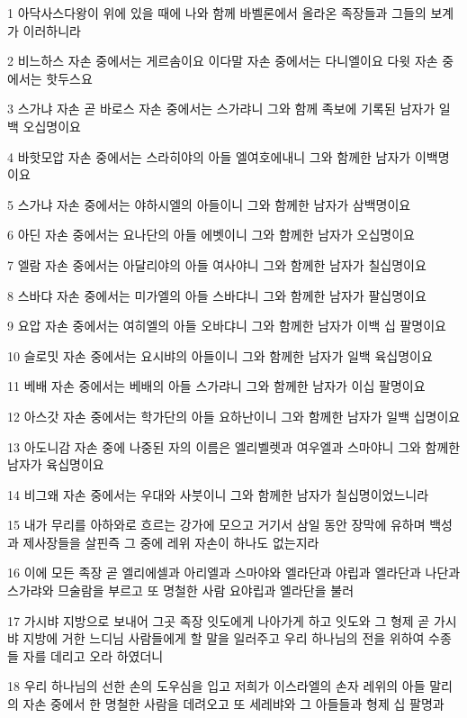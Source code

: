 \par 1 아닥사스다왕이 위에 있을 때에 나와 함께 바벨론에서 올라온 족장들과 그들의 보계가 이러하니라
\par 2 비느하스 자손 중에서는 게르솜이요 이다말 자손 중에서는 다니엘이요 다윗 자손 중에서는 핫두스요
\par 3 스가냐 자손 곧 바로스 자손 중에서는 스가랴니 그와 함께 족보에 기록된 남자가 일백 오십명이요
\par 4 바핫모압 자손 중에서는 스라히야의 아들 엘여호에내니 그와 함께한 남자가 이백명이요
\par 5 스가냐 자손 중에서는 야하시엘의 아들이니 그와 함께한 남자가 삼백명이요
\par 6 아딘 자손 중에서는 요나단의 아들 에벳이니 그와 함께한 남자가 오십명이요
\par 7 엘람 자손 중에서는 아달리야의 아들 여사야니 그와 함께한 남자가 칠십명이요
\par 8 스바댜 자손 중에서는 미가엘의 아들 스바댜니 그와 함께한 남자가 팔십명이요
\par 9 요압 자손 중에서는 여히엘의 아들 오바댜니 그와 함께한 남자가 이백 십 팔명이요
\par 10 슬로밋 자손 중에서는 요시뱌의 아들이니 그와 함께한 남자가 일백 육십명이요
\par 11 베배 자손 중에서는 베배의 아들 스가랴니 그와 함께한 남자가 이십 팔명이요
\par 12 아스갓 자손 중에서는 학가단의 아들 요하난이니 그와 함께한 남자가 일백 십명이요
\par 13 아도니감 자손 중에 나중된 자의 이름은 엘리벨렛과 여우엘과 스마야니 그와 함께한 남자가 육십명이요
\par 14 비그왜 자손 중에서는 우대와 사붓이니 그와 함께한 남자가 칠십명이었느니라
\par 15 내가 무리를 아하와로 흐르는 강가에 모으고 거기서 삼일 동안 장막에 유하며 백성과 제사장들을 살핀즉 그 중에 레위 자손이 하나도 없는지라
\par 16 이에 모든 족장 곧 엘리에셀과 아리엘과 스마야와 엘라단과 야립과 엘라단과 나단과 스가랴와 므술람을 부르고 또 명철한 사람 요야립과 엘라단을 불러
\par 17 가시뱌 지방으로 보내어 그곳 족장 잇도에게 나아가게 하고 잇도와 그 형제 곧 가시뱌 지방에 거한 느디님 사람들에게 할 말을 일러주고 우리 하나님의 전을 위하여 수종들 자를 데리고 오라 하였더니
\par 18 우리 하나님의 선한 손의 도우심을 입고 저희가 이스라엘의 손자 레위의 아들 말리의 자손 중에서 한 명철한 사람을 데려오고 또 세레뱌와 그 아들들과 형제 십 팔명과
